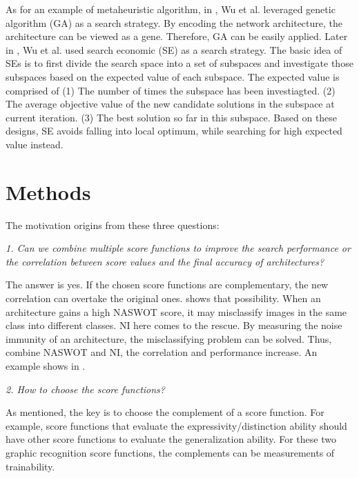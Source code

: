 \documentclass[sigconf]{acmart}
\begin{document}
    As for an example of metaheuristic algorithm, in \cite{10.1145/3491396.3506510}, Wu et al. leveraged 
    genetic algorithm (GA) as a search strategy. 
    By encoding the network architecture, the architecture can be viewed as a gene. Therefore, GA can be 
    easily applied. 
    Later in \cite{10092788}, Wu et al. used search economic (SE) \cite{7379579} as a search strategy. The 
    basic idea of SEs is to first divide the search space into a set of subspaces and investigate those 
    subspaces based on the expected value of each subspace. The expected value is comprised of 
    (1) The number of times the subspace has been investiagted. 
    (2) The average objective value of the new candidate solutions in the subspace at current iteration. 
    (3) The best solution so far in this subspace. 
    Based on these designs, SE avoids falling into local optimum, while searching for high expected value instead. 
    
    \section{Methods}
    \label{sec:proposed}
    
    The motivation origins from these three questions: 

    \textit{1. Can we combine multiple score functions to improve the search performance 
    or the correlation between score values and the final accuracy of architectures?}
    
    The answer is yes. If the chosen score functions are complementary, the new correlation 
    can overtake the original ones. \cite{10.1145/3491396.3506510} 
    shows that possibility. When an architecture gains a high NASWOT score, 
    it may misclassify images in the same class into different classes. NI here comes 
    to the rescue. By measuring the noise immunity of an architecture, the misclassifying problem 
    can be solved. Thus, combine NASWOT and NI, the correlation and performance increase. 
    An example shows in .

    \textit{2. How to choose the score functions?}

    As mentioned, the key is to choose the complement of a score function. For example, 
    score functions that evaluate the expressivity/distinction ability should have other 
    score functions to evaluate the generalization ability. For these two graphic recognition 
    score functions, the complements can be measurements of trainability. 
\end{document}
